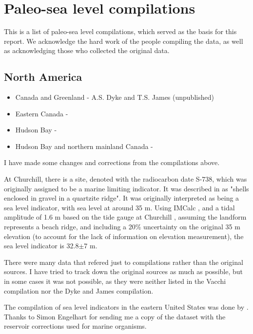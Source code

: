 \section{Paleo-sea level compilations}

This is a list of paleo-sea level compilations, which served as the basis for this report. We acknowledge the hard work of the people compiling the data, as well as acknowledging those who collected the original data.

\subsection{North America}

\begin{itemize}
  \item Canada and Greenland - A.S. Dyke and T.S. James (unpublished)
  \item Eastern Canada - \citet{VacchiEtal2018}
  \item Hudson Bay - \citet{SimonEtal2016}
  \item Hudson Bay and northern mainland Canada - \citet{GowanEtal2016}
\end{itemize}

I have made some changes and corrections from the compilations above.

At Churchill, there is a site, denoted with the radiocarbon date S-738, which was originally assigned to be a marine limiting indicator. It was described in \citet{MorlanEtal2000} as "shells enclosed in gravel in a quartzite ridge". It was originally interpreted as being a sea level indicator, with sea level at around 35 m. Using IMCalc  \citep{LorscheidRovere2019}, and a tidal amplitude of 1.6 m based on the tide gauge at Churchill \citep{Ray2016}, assuming the landform represents a beach ridge, and including a 20\% uncertainty on the original 35 m elevation (to account for the lack of information on elevation measurement), the sea level indicator is 32.8$\pm$7 m.

There were many data that refered just to compilations rather than the original sources. I have tried to track down the original sources as much as possible, but in some cases it was not possible, as they were neither listed in the Vacchi compilation nor the Dyke and James compilation.

The compilation of sea level indicators in the eastern United States was done by \citet{EngelhartHorton2012}. Thanks to Simon Engelhart for sending me a copy of the dataset with the reservoir corrections used for marine organisms.

